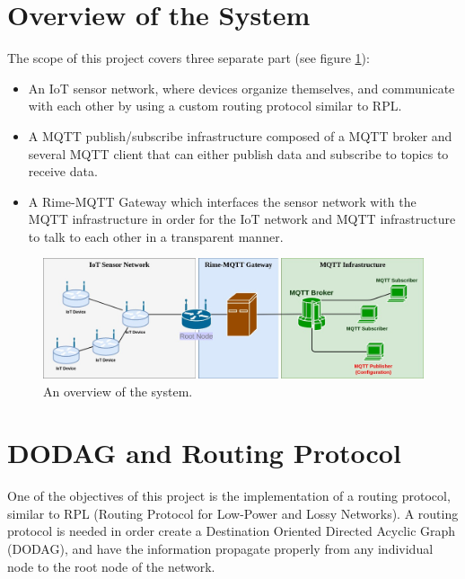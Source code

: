\documentclass[a4paper,11pt]{article}
\begin{document}

\section{Overview of the System}
The scope of this project covers three separate part (see figure \ref{fig:architecture1}):
\begin{itemize}
\item{An IoT sensor network, where devices organize themselves, and communicate with each other by using a custom routing protocol similar to RPL.}
\item{A MQTT publish/subscribe infrastructure composed of a MQTT broker and several MQTT client that can either publish data and subscribe to topics to receive data.}
\item{A Rime-MQTT Gateway which interfaces the sensor network with the MQTT infrastructure in order for the IoT network and MQTT infrastructure to talk to each other in a transparent manner.}
\end{itemize}

\begin{figure}
  \includegraphics[width=\linewidth]{img/architecture-2.jpg}
  \caption{An overview of the system.}
  \label{fig:architecture1}
\end{figure}
\section{DODAG and Routing Protocol}
One of the objectives of this project is the implementation of a routing protocol, similar to RPL (Routing Protocol for Low-Power and Lossy Networks). A routing protocol is needed in order create a Destination Oriented Directed Acyclic Graph (DODAG), and have the information propagate properly from any individual node to the root node of the network.\\
\end{document}
